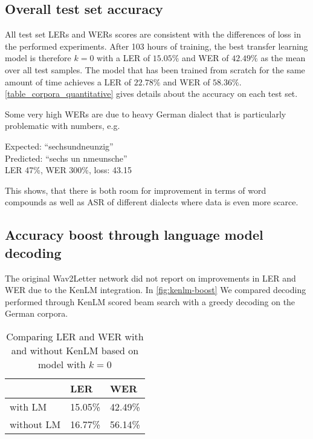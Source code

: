 \documentclass[11pt,a4paper]{article}
\begin{document}
\subsection{Overall test set accuracy}

All test set \acp{LER} and \acp{WER} scores are consistent with the differences of loss in the performed experiments.
After 103 hours of training, the best transfer learning model is therefore $k = 0$ with a \ac{LER} of $15.05\%$ and \ac{WER} of $42.49\%$ as the mean over all test samples.
The model that has been trained from scratch for the same amount of time achieves a \ac{LER} of $22.78\%$ and \ac{WER} of $58.36\%$.
\autoref{table_corpora_quantitative} gives details about the accuracy on each test set.

Some very high \acp{WER} are due to heavy German dialect that is particularly problematic with numbers, e.g.
\begin{framed}
\noindent
Expected:  ``sechsundneunzig'' \\
Predicted: ``sechs un nmeunsche'' \\
LER 47\%, WER 300\%, loss: 43.15
\end{framed}
This shows, that there is both room for improvement in terms of word compounds as well as \ac{ASR} of different dialects where data is even more scarce.

\subsection{Accuracy boost through language model decoding}

The original Wav2Letter network did not report on improvements in \ac{LER} and \ac{WER} due to the KenLM integration.
In \autoref{fig:kenlm-boost} We compared decoding performed through KenLM scored beam search with a greedy decoding on the German corpora.

\begin{table}[h]
\begin{tabular}{l l l}
  \toprule
  & LER & WER \\
  \midrule
  with LM & 15.05\% & 42.49\% \\
  without LM & 16.77\% & 56.14\% \\
  \bottomrule
\end{tabular}
\centering
\caption{Comparing \ac{LER} and \ac{WER} with and without KenLM based on model with $k = 0$}
\label{fig:kenlm-boost}
\end{table}
\end{document}
